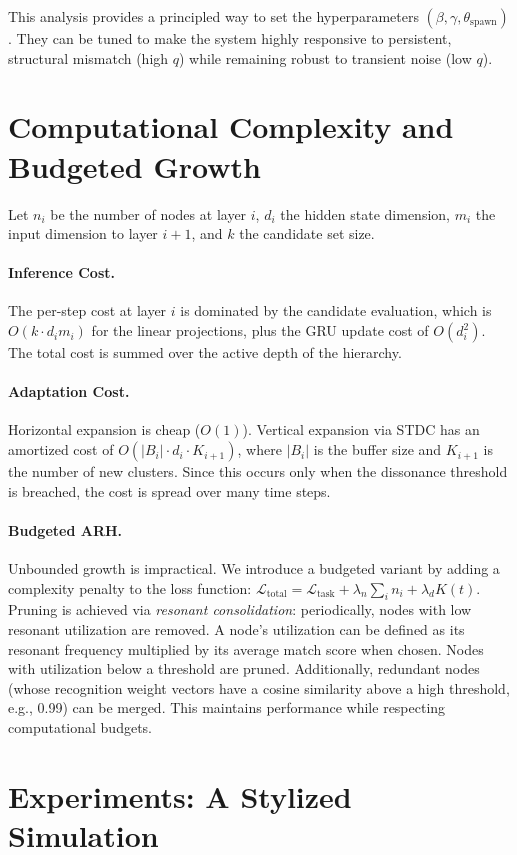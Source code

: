 \documentclass{article}
\begin{document}
This analysis provides a principled way to set the hyperparameters $(\beta, \gamma, \theta_{\text{spawn}})$. They can be tuned to make the system highly responsive to persistent, structural mismatch (high $q$) while remaining robust to transient noise (low $q$).

\section{Computational Complexity and Budgeted Growth}
Let $n_i$ be the number of nodes at layer $i$, $d_i$ the hidden state dimension, $m_i$ the input dimension to layer $i+1$, and $k$ the candidate set size.
\paragraph{Inference Cost.} The per-step cost at layer $i$ is dominated by the candidate evaluation, which is $O(k \cdot d_i m_i)$ for the linear projections, plus the GRU update cost of $O(d_i^2)$. The total cost is summed over the active depth of the hierarchy.
\paragraph{Adaptation Cost.} Horizontal expansion is cheap ($O(1)$). Vertical expansion via STDC has an amortized cost of $O(|B_i| \cdot d_i \cdot K_{i+1})$, where $|B_i|$ is the buffer size and $K_{i+1}$ is the number of new clusters. Since this occurs only when the dissonance threshold is breached, the cost is spread over many time steps.

\paragraph{Budgeted ARH.} Unbounded growth is impractical. We introduce a budgeted variant by adding a complexity penalty to the loss function: $\mathcal{L}_{\text{total}} = \mathcal{L}_{\text{task}} + \lambda_n \sum_i n_i + \lambda_d K(t)$. Pruning is achieved via \emph{resonant consolidation}: periodically, nodes with low resonant utilization are removed. A node's utilization can be defined as its resonant frequency multiplied by its average match score when chosen. Nodes with utilization below a threshold are pruned. Additionally, redundant nodes (whose recognition weight vectors have a cosine similarity above a high threshold, e.g., 0.99) can be merged. This maintains performance while respecting computational budgets.

\section{Experiments: A Stylized Simulation}
\end{document}
